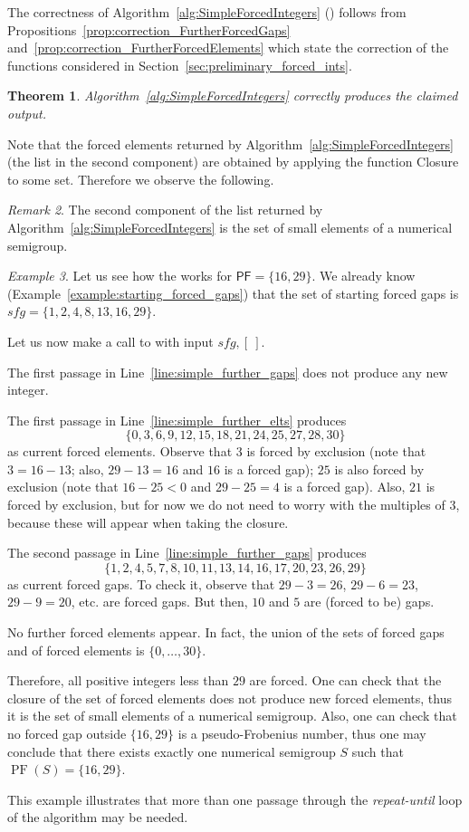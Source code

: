 \documentclass[11pt]{amsart}
\newtheorem{theorem}{Theorem}
\theoremstyle{remark}
\newtheorem{example}[theorem]{Example}
\newtheorem{remark}[theorem]{Remark}
\begin{document}
The correctness of Algorithm~\ref{alg:SimpleForcedIntegers} (\SimpleForcedIntegers) follows from Propositions~\ref{prop:correction_FurtherForcedGaps} and~\ref{prop:correction_FurtherForcedElements} which state the correction of the functions considered in Section~\ref{sec:preliminary_forced_ints}.
\begin{theorem}\label{th:correction_quick_forced_integers}
Algorithm~\ref{alg:SimpleForcedIntegers} correctly produces the claimed output. 
\end{theorem}
Note that the forced elements returned by Algorithm~\ref{alg:SimpleForcedIntegers} (the list in the second component) are obtained by applying the function Closure to some set. Therefore we observe the following.
\begin{remark}\label{rem:forced_elts_are_small_elts_QV}
The second component of the list returned by Algorithm~\ref{alg:SimpleForcedIntegers} is the set of small elements of a numerical semigroup.
\end{remark}
\begin{example}\label{example:all_forced}
Let us see how the \SimpleForcedIntegers works for ${\ensuremath{\mathsf{PF}}}=\{16,29\}$. We already know (Example~\ref{example:starting_forced_gaps}) that the set of starting forced gaps is $sfg = \{1,2,4,8,13,16,29\}$.

Let us now make a call to \SimpleForcedIntegers with input $sfg, [\ ]$.

The first passage in Line~\ref{line:simple_further_gaps} does not produce any new integer.

The first passage in Line~\ref{line:simple_further_elts} produces 
$$\{0, 3, 6, 9, 12, 15, 18, 21, 24, 25, 27, 28, 30\}$$ 
as current forced elements. Observe that $3$ is forced by exclusion (note that $3=16-13$; also, $29-13=16$ and $16$ is a forced gap); $25$ is also forced by exclusion (note that $16-25<0$ and $29-25=4$ is a forced gap). Also, $21$ is forced by exclusion, but for now we do not need to worry with the multiples of $3$, because these will appear when taking the closure.

The second passage in Line~\ref{line:simple_further_gaps} produces 
$$\{1, 2, 4, 5, 7, 8, 10, 11, 13, 14, 16, 17, 20, 23, 26, 29\}$$ 
as current forced gaps.
To check it, observe that $29-3=26$, $29-6=23$, $29-9=20$, etc. are forced gaps. But then, $10$ and $5$ are (forced to be) gaps.

No further forced elements appear. In fact, the union of the sets of forced gaps and of forced elements is $\{0,\ldots,30\}$.

Therefore, all positive integers less than $29$ are forced. One can check that the closure of the set of forced elements does not produce new forced elements, thus it is the set of small elements of a numerical semigroup. Also, one can check that no forced gap outside $\{16,29\}$ is a pseudo-Frobenius number, thus one may conclude that there exists exactly one numerical semigroup $S$ such that $\operatorname{PF}(S)=\{16,29\}$.

This example illustrates that more than one passage through the \emph{repeat-until} loop of the algorithm \SimpleForcedIntegers may be needed.
\end{example}
\end{document}
